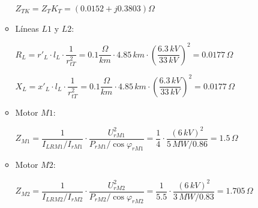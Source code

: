 \begin{enumerate}
\begin{itemize}
                        $Z_\textit{TK} = Z_\textit{T} K_\textit{T} = (0.0152 + j 0.3803) \varOmega$\vspace{2mm}

                        \item Líneas $L1$ y $L2$:\vspace{2mm}
                        
                        $R_\textit{L} = r'_\textit{L}\cdot l_\textit{L}\cdot\dfrac{1}{r_\textit{tT}^2} = 0.1\dfrac{\varOmega}{\textit{km}}\cdot 4.85\,\textit{km}\cdot \left(\dfrac{6.3\,\textit{kV}}{33\,\textit{kV}}\right)^2 = 0.0177\,\varOmega$\vspace{2mm}

                        $X_\textit{L} = x'_\textit{L}\cdot l_\textit{L}\cdot\dfrac{1}{r_\textit{tT}^2} = 0.1\dfrac{\varOmega}{\textit{km}}\cdot 4.85\,\textit{km}\cdot \left(\dfrac{6.3\,\textit{kV}}{33\,\textit{kV}}\right)^2 = 0.0177\,\varOmega$\vspace{2mm}

                        \item Motor $M1$:\vspace{2mm}
                        
                        $Z_\textit{M1} = \dfrac{1}{I_\textit{LRM1}/I_\textit{rM1}}\cdot \dfrac{U_\textit{rM1}^2}{P_\textit{rM1}/\cos\varphi_\textit{rM1}} = \dfrac{1}{4}\cdot \dfrac{(6\,\textit{kV})^2}{5\,\textit{MW}/0.86} = 1.5\,\varOmega$\vspace{2mm}

                        \item Motor $M2$:\vspace{2mm}
                        
                        $Z_\textit{M2} = \dfrac{1}{I_\textit{LRM2}/I_\textit{rM2}}\cdot \dfrac{U_\textit{rM2}^2}{P_\textit{rM2}/\cos\varphi_\textit{rM2}} = \dfrac{1}{5.5}\cdot \dfrac{(6\,\textit{kV})^2}{3\,\textit{MW}/0.83} = 1.705\,\varOmega$\vspace{2mm}
                    \end{itemize}


\end{enumerate}
